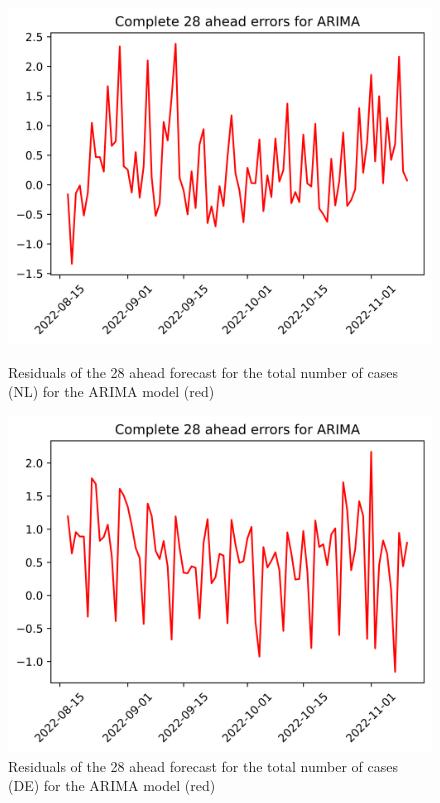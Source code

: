 \begin{figure}

\begin{minipage}{.32\textwidth}
  \centering
  \includegraphics[width=\linewidth]{pics/28_ah/28_ahead_errors_ARIMA.png}
  \caption{Residuals of the 28 ahead forecast for the total number of cases (NL) for the ARIMA model (red)}
  \label{fig:tot_cases_error_28_ARIMA}
\end{minipage}
\begin{minipage}{.32\textwidth}
  \centering
  \includegraphics[width=\linewidth]{pics/28_ah/DE_28_ahead_errors_ARIMA.png}
  \caption{Residuals of the 28 ahead forecast for the total number of cases (DE) for the ARIMA model (red)}

\end{minipage}
\end{figure}
